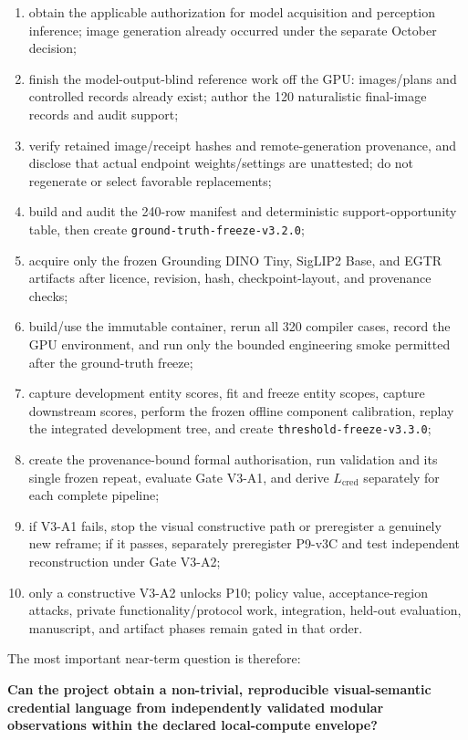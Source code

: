\documentclass[11pt,a4paper]{article}
\newcommand{\code}[1]{\texttt{#1}}
\begin{document}
\begin{enumerate}
  \item obtain the applicable authorization for model acquisition and perception inference; image generation already occurred under the separate October decision;
  \item finish the model-output-blind reference work off the GPU: images/plans and controlled records already exist; author the 120 naturalistic final-image records and audit support;
  \item verify retained image/receipt hashes and remote-generation provenance, and disclose that actual endpoint weights/settings are unattested; do not regenerate or select favorable replacements;
  \item build and audit the 240-row manifest and deterministic support-opportunity table, then create \code{ground-truth-freeze-v3.2.0};
  \item acquire only the frozen Grounding DINO Tiny, SigLIP2 Base, and EGTR artifacts after licence, revision, hash, checkpoint-layout, and provenance checks;
  \item build/use the immutable container, rerun all 320 compiler cases, record the GPU environment, and run only the bounded engineering smoke permitted after the ground-truth freeze;
  \item capture development entity scores, fit and freeze entity scopes, capture downstream scores, perform the frozen offline component calibration, replay the integrated development tree, and create \code{threshold-freeze-v3.3.0};
  \item create the provenance-bound formal authorisation, run validation and its single frozen repeat, evaluate Gate V3-A1, and derive $L_{\mathrm{cred}}$ separately for each complete pipeline;
  \item if V3-A1 fails, stop the visual constructive path or preregister a genuinely new reframe; if it passes, separately preregister P9-v3C and test independent reconstruction under Gate V3-A2;
  \item only a constructive V3-A2 unlocks P10; policy value, acceptance-region attacks, private functionality/protocol work, integration, held-out evaluation, manuscript, and artifact phases remain gated in that order.
\end{enumerate}

The most important near-term question is therefore:

\begin{keybox}
\centering
\textbf{Can the project obtain a non-trivial, reproducible visual-semantic credential language from independently validated modular observations within the declared local-compute envelope?}
\end{keybox}
\end{document}
